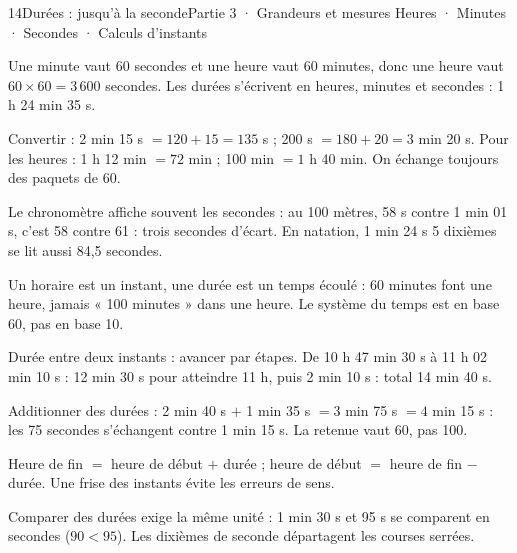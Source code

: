 \begin{ouverture}[grandeurs]{14}{Durées : jusqu’à la seconde}{Partie 3 · Grandeurs et mesures}
{Heures · Minutes · Secondes · Calculs d’instants}
\end{ouverture}
\pagestyle{otMain}\essentiel\fontsize{11}{15}\selectfont
{}\label{cours-14-1}
\begin{definition}Une minute vaut 60 secondes et une heure vaut 60 minutes, donc une heure vaut $60\times60=3\,600$ secondes. Les durées s’écrivent en heures, minutes et secondes : 1 h 24 min 35 s.\end{definition}
\begin{savoirfaire}Convertir : 2 min 15 s $=120+15=135$ s ; 200 s $=180+20=3$ min 20 s. Pour les heures : 1 h 12 min $=72$ min ; 100 min $=1$ h 40 min. On échange toujours des paquets de 60.\end{savoirfaire}
\begin{exemple}Le chronomètre affiche souvent les secondes : au 100 mètres, 58 s contre 1 min 01 s, c’est 58 contre 61 : trois secondes d’écart. En natation, 1 min 24 s 5 dixièmes se lit aussi 84,5 secondes.\end{exemple}
\begin{attention}Un horaire est un instant, une durée est un temps écoulé : 60 minutes font une heure, jamais « 100 minutes » dans une heure. Le système du temps est en base 60, pas en base 10.\end{attention}
\clearpage
{}\label{cours-14-2}
\begin{savoirfaire}Durée entre deux instants : avancer par étapes. De 10 h 47 min 30 s à 11 h 02 min 10 s : 12 min 30 s pour atteindre 11 h, puis 2 min 10 s : total 14 min 40 s.\end{savoirfaire}
\begin{exemple}Additionner des durées : 2 min 40 s $+$ 1 min 35 s $=3$ min 75 s $=4$ min 15 s : les 75 secondes s’échangent contre 1 min 15 s. La retenue vaut 60, pas 100.\end{exemple}
\begin{propriete}Heure de fin $=$ heure de début $+$ durée ; heure de début $=$ heure de fin $-$ durée. Une frise des instants évite les erreurs de sens.\end{propriete}
\begin{attention}Comparer des durées exige la même unité : 1 min 30 s et 95 s se comparent en secondes ($90<95$). Les dixièmes de seconde départagent les courses serrées.\end{attention}

